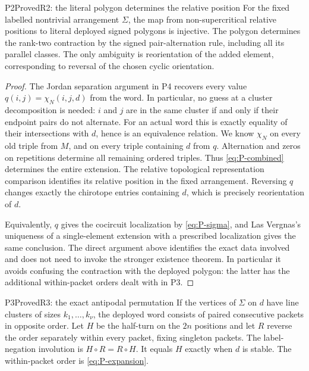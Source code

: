 \begin{resultenv}{P2}{Proved}{R2: the literal polygon determines the relative position}
For the fixed labelled nontrivial arrangement $\Sigma$, the map from
non-supercritical relative positions to literal deployed signed
polygons is injective.  The polygon determines the rank-two
contraction by the signed pair-alternation rule, including all its
parallel classes.  The only ambiguity is reorientation of the added
element, corresponding to reversal of the chosen cyclic orientation.
\end{resultenv}

\begin{proof}
The Jordan separation argument in P4 recovers every value
$q(i,j)=\chi_N(i,j,d)$ from the word.  In particular, no guess at a
cluster decomposition is needed: $i$ and $j$ are in the same cluster
if and only if their endpoint pairs do not alternate.  For an actual
word this is exactly equality of their intersections with $d$, hence
is an equivalence relation.  We know $\chi_N$ on every old triple
from $M$, and on every triple containing $d$ from $q$.  Alternation
and zeros on repetitions determine all remaining ordered triples.
Thus \eqref{eq:P-combined} determines the entire extension.  The
relative topological representation comparison identifies its
relative position in the fixed arrangement.  Reversing $q$ changes
exactly the chirotope entries containing $d$, which is precisely
reorientation of $d$.

Equivalently, $q$ gives the cocircuit localization by
\eqref{eq:P-sigma}, and Las Vergnas's uniqueness of a single-element
extension with a prescribed localization gives the same conclusion.
The direct argument above identifies the exact data involved and
does not need to invoke the stronger existence theorem.  In
particular it avoids confusing the contraction with the deployed
polygon: the latter has the additional within-packet orders dealt
with in P3.
\end{proof}

\begin{resultenv}{P3}{Proved}{R3: the exact antipodal permutation}
If the vertices of $\Sigma$ on $d$ have line clusters of sizes
$k_1,\ldots,k_\nu$, the deployed word consists of paired consecutive
packets in opposite order.  Let $H$ be the half-turn on the $2n$
positions and let $R$ reverse the order separately within every
packet, fixing singleton packets.  The label-negation involution is
$H\circ R=R\circ H$.  It equals $H$ exactly when $d$ is stable.
The within-packet order is \eqref{eq:P-expansion}.
\end{resultenv}

